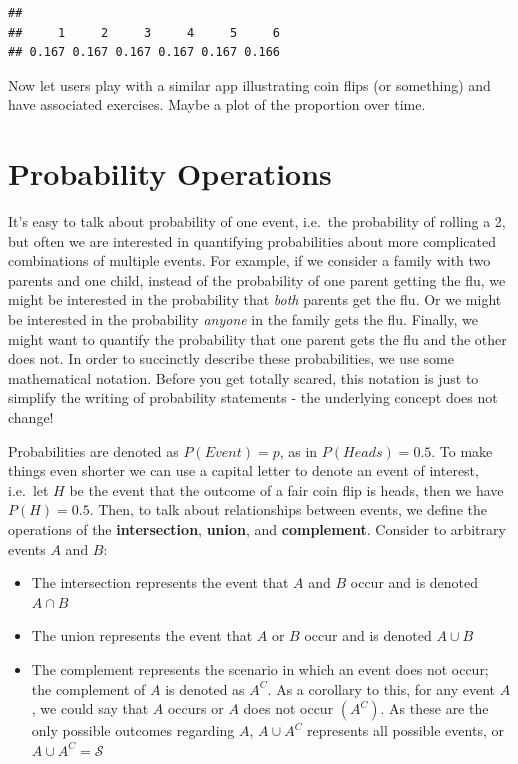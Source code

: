 \documentclass[
]{book}
\providecommand{\tightlist}{%
  \setlength{\itemsep}{0pt}\setlength{\parskip}{0pt}}
\theoremstyle{definition}
\theoremstyle{definition}
\theoremstyle{definition}
\theoremstyle{remark}
\begin{document}
\begin{verbatim}
## 
##     1     2     3     4     5     6 
## 0.167 0.167 0.167 0.167 0.167 0.166
\end{verbatim}

Now let users play with a similar app illustrating coin flips (or something) and have associated exercises. Maybe a plot of the proportion over time.

\hypertarget{ch4_s2}{%
\section{Probability Operations}\label{ch4_s2}}

It's easy to talk about probability of one event, i.e.~the probability of rolling a 2, but often we are interested in quantifying probabilities about more complicated combinations of multiple events. For example, if we consider a family with two parents and one child, instead of the probability of one parent getting the flu, we might be interested in the probability that \emph{both} parents get the flu. Or we might be interested in the probability \emph{anyone} in the family gets the flu. Finally, we might want to quantify the probability that one parent gets the flu and the other does not. In order to succinctly describe these probabilities, we use some mathematical notation. Before you get totally scared, this notation is just to simplify the writing of probability statements - the underlying concept does not change!

Probabilities are denoted as \(P(Event) = p\), as in \(P(Heads) = 0.5\). To make things even shorter we can use a capital letter to denote an event of interest, i.e.~let \(H\) be the event that the outcome of a fair coin flip is heads, then we have \(P(H) = 0.5\). Then, to talk about relationships between events, we define the operations of the \textbf{intersection}, \textbf{union}, and \textbf{complement}. Consider to arbitrary events \(A\) and \(B\):

\begin{itemize}
\tightlist
\item
  The intersection represents the event that \(A\) and \(B\) occur and is denoted \(A \cap B\)\\
\item
  The union represents the event that \(A\) or \(B\) occur and is denoted \(A \cup B\)\\
\item
  The complement represents the scenario in which an event does not occur; the complement of \(A\) is denoted as \(A^C\). As a corollary to this, for any event \(A\), we could say that \(A\) occurs or \(A\) does not occur \((A^C)\). As these are the only possible outcomes regarding \(A\), \(A \cup A^C\) represents all possible events, or \(A \cup A^C = \mathcal{S}\)
\end{itemize}
\end{document}
